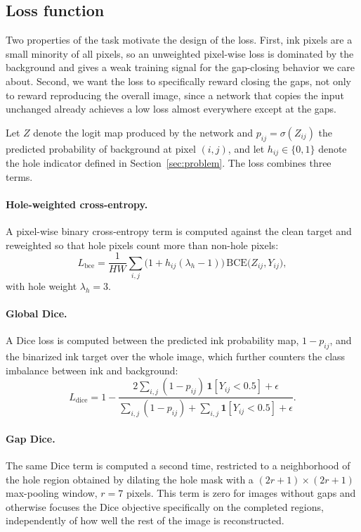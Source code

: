 \documentclass[11pt]{article}
\begin{document}
\subsection{Loss function}

Two properties of the task motivate the design of the loss. First, ink pixels are a
small minority of all pixels, so an unweighted pixel-wise loss is dominated by the
background and gives a weak training signal for the gap-closing behavior we care
about. Second, we want the loss to specifically reward closing the gaps, not only
to reward reproducing the overall image, since a network that copies the input
unchanged already achieves a low loss almost everywhere except at the gaps.

Let $Z$ denote the logit map produced by the network and $p_{ij} = \sigma(Z_{ij})$ the predicted probability of background at pixel $(i,j)$, and let $h_{ij} \in \{0,1\}$ denote the hole indicator defined in Section~\ref{sec:problem}. The loss combines three terms.

\paragraph{Hole-weighted cross-entropy.} A pixel-wise binary cross-entropy term is
computed against the clean target and reweighted so that hole pixels count more
than non-hole pixels:
\begin{equation}
  L_{\mathrm{bce}} = \frac{1}{HW} \sum_{i,j} \bigl(1 + h_{ij}(\lambda_h - 1)\bigr)
  \,\mathrm{BCE}\bigl(Z_{ij}, Y_{ij}\bigr),
\end{equation}
with hole weight $\lambda_h = 3$.

\paragraph{Global Dice.} A Dice loss \citep{milletari2016vnet} is computed between
the predicted ink probability map, $1 - p_{ij}$, and the binarized ink target over
the whole image, which further counters the class imbalance between ink and
background:
\begin{equation}
  L_{\mathrm{dice}} = 1 - \frac{2 \sum_{i,j} (1-p_{ij})\, \mathbf{1}[Y_{ij}<0.5] + \epsilon}
  {\sum_{i,j} (1-p_{ij}) + \sum_{i,j} \mathbf{1}[Y_{ij}<0.5] + \epsilon}.
\end{equation}

\paragraph{Gap Dice.} The same Dice term is computed a second time, restricted to a
neighborhood of the hole region obtained by dilating the hole mask with a
$(2r+1)\times(2r+1)$ max-pooling window, $r=7$ pixels. This term is zero for images
without gaps and otherwise focuses the Dice objective specifically on the completed
regions, independently of how well the rest of the image is reconstructed.
\end{document}
